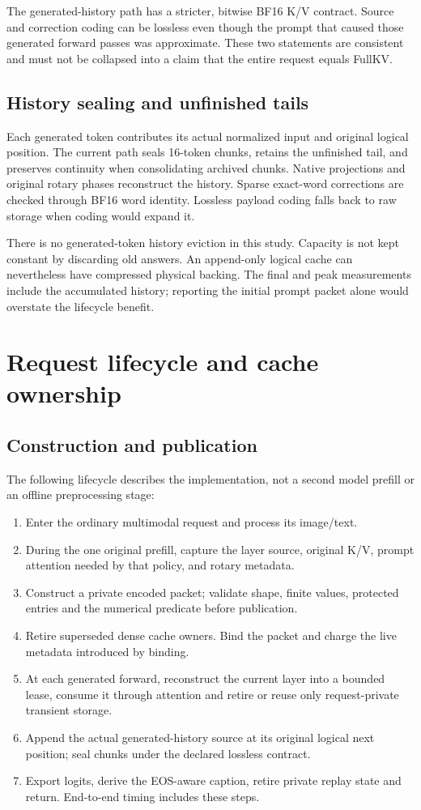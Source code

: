 \documentclass{article}
\begin{document}
The generated-history path has a stricter, bitwise BF16 K/V contract.
Source and correction coding can be lossless even though the prompt that
caused those generated forward passes was approximate. These two
statements are consistent and must not be collapsed into a claim that
the entire request equals FullKV.

\subsection{History sealing and unfinished tails}
Each generated token contributes its actual normalized input and original
logical position. The current path seals 16-token chunks, retains the
unfinished tail, and preserves continuity when consolidating archived
chunks. Native projections and original rotary phases reconstruct the
history. Sparse exact-word corrections are checked through BF16 word
identity. Lossless payload coding falls back to raw storage when coding
would expand it.

There is no generated-token history eviction in this study. Capacity is
not kept constant by discarding old answers. An append-only logical cache
can nevertheless have compressed physical backing. The final and peak
measurements include the accumulated history; reporting the initial
prompt packet alone would overstate the lifecycle benefit.

\section{Request lifecycle and cache ownership}
\subsection{Construction and publication}
The following lifecycle describes the implementation, not a second model
prefill or an offline preprocessing stage:
\begin{enumerate}
\item Enter the ordinary multimodal request and process its image/text.
\item During the one original prefill, capture the layer source, original
      K/V, prompt attention needed by that policy, and rotary metadata.
\item Construct a private encoded packet; validate shape, finite values,
      protected entries and the numerical predicate before publication.
\item Retire superseded dense cache owners. Bind the packet and charge
      the live metadata introduced by binding.
\item At each generated forward, reconstruct the current layer into a
      bounded lease, consume it through attention and retire or reuse
      only request-private transient storage.
\item Append the actual generated-history source at its original logical
      next position; seal chunks under the declared lossless contract.
\item Export logits, derive the EOS-aware caption, retire private replay
      state and return. End-to-end timing includes these steps.
\end{enumerate}
\end{document}
